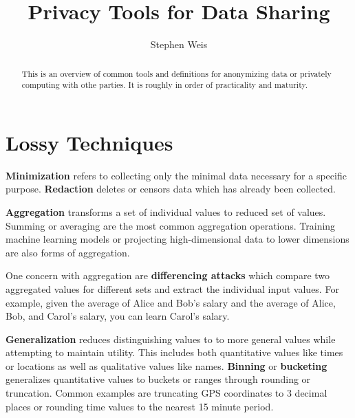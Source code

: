 \documentclass[nobib]{tufte-handout}
\title{Privacy Tools for Data Sharing}
\author[Stephen Weis]{Stephen Weis}
\begin{document}
\maketitle%

 \begin{abstract} \noindent This is an overview of common tools and definitions
for anonymizing data or privately computing with othe parties. It is roughly in
order of practicality and maturity. \end{abstract}

\section{Lossy Techniques} \textbf{Minimization} refers to collecting only the
minimal data necessary for a specific purpose. \textbf{Redaction} deletes or
censors data which has already been collected.



\textbf{Aggregation} transforms a set of individual values to reduced set of
values. Summing or averaging are the most common aggregation operations.
Training machine learning models or projecting high-dimensional data to lower
dimensions are also forms of aggregation.

One concern with aggregation are \textbf{differencing attacks} which compare two
aggregated values for different sets and extract the individual input values.
For example, given the average of Alice and Bob’s salary and the average of
Alice, Bob, and Carol’s salary, you can learn Carol’s salary.

\textbf{Generalization} reduces distinguishing values to to more general values
while attempting to maintain utility. This includes both quantitative values
like times or locations as well as qualitative values like names.
\textbf{Binning} or \textbf{bucketing} generalizes quantitative values to
buckets or ranges through rounding or truncation. Common examples are
truncating GPS coordinates to 3 decimal places or rounding time values to the
nearest 15 minute period.
\end{document}
